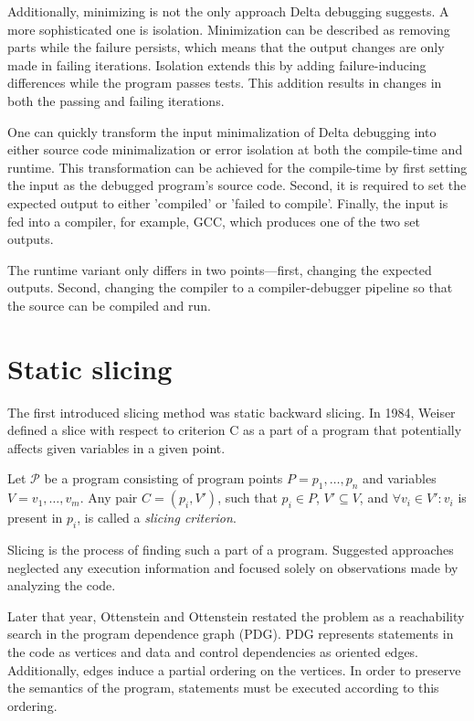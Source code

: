 Additionally, minimizing is not the only approach Delta debugging suggests.
A more sophisticated one is isolation. Minimization can be described as removing parts
while the failure persists, which means that the output changes are only made in failing
iterations.
Isolation extends this by adding failure-inducing differences while the program passes tests.
This addition results in changes in both the passing and failing iterations.

One can quickly transform the input minimalization of Delta debugging into either source
code minimalization or error isolation at both the compile-time and runtime.
This transformation can be achieved for the compile-time by first setting the input
as the debugged program's source code. 
Second, it is required to set the expected
output to either 'compiled' or 'failed to compile'. 
Finally, the input is fed into a compiler, for example, GCC, which produces
one of the two set outputs. 

The runtime variant only differs in two points—first, changing the expected outputs. 
Second, changing the compiler to a compiler-debugger pipeline so that the source 
can be compiled and run.

\section{Static slicing}

The first introduced slicing method was static backward slicing. 
In 1984, Weiser defined a slice with respect to criterion C 
as a part of a program that potentially affects given variables in a given point. 

\begin{defn}\label{def02:5}
  Let $\mathcal{P}$ be a program consisting of program points 
  $P = p_1,\dots,p_n$ and variables $V = v_1,\dots,v_m$.
  Any pair $C = (p_i, V')$, such that $p_i \in P$, $V' \subseteq V$, and 
  $\forall v_i \in V': v_i$ is present in $p_i$, 
  is called a \emph{slicing criterion}.
\end{defn}

Slicing is the process of finding such a part of a program. 
Suggested approaches neglected any execution information and 
focused solely on observations made by analyzing the code.


Later that year, Ottenstein and Ottenstein restated the problem as a reachability
search in the program dependence graph (PDG).
PDG represents statements in the code as vertices and data and control
dependencies as oriented edges. 
Additionally, edges induce a partial ordering on the vertices. 
In order to preserve the semantics of the program, statements must be executed 
according to this ordering. 

